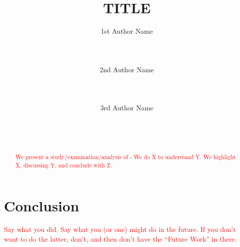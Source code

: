 \documentclass{sigchi}
\begin{document}
\title{TITLE}

\author{
  \alignauthor 1st Author Name\\
    \\
    \\
    \\
  \alignauthor 2nd Author Name\\
    \\
    \\
    \\
  \alignauthor 3rd Author Name\\
    \\
    \\
    \\
}

\maketitle

\begin{abstract}
\begin{comment}
You should write an abstract early on, knowing fully well that you will (and should) iterate through it at least 3-4 times. It is also the thing you should edit again just before you submit.
\end{comment}
\textcolor{red}{We present a study/examination/analysis of - We do X to understand Y. We highlight X, discussing Y, and conclude with Z.
}
\end{abstract}










\section{Conclusion}
\textcolor{red}{Say what you did. Say what you (or one) might do in the future. If you don’t want to do the latter, don’t, and then don’t have the “Future Work” in there. }

\balance



\end{document}

